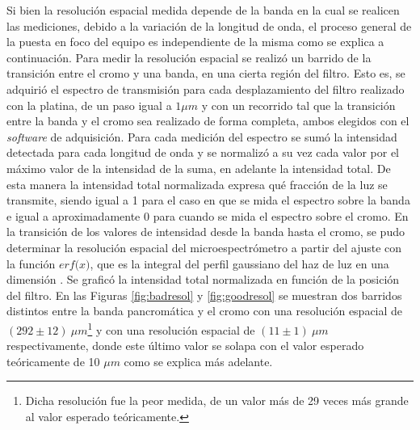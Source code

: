 Si bien la resolución espacial medida depende de la banda en la cual se realicen las mediciones, debido a la variación de la longitud de onda, el proceso general de la puesta en foco del equipo es independiente de la misma como se explica a continuación. Para medir la resolución espacial se realizó un barrido de la transición entre el cromo y una banda, en una cierta región del filtro. Esto es, se adquirió el espectro de transmisión para cada desplazamiento del filtro realizado con la platina, de un paso igual a $1\mu m$ y con un recorrido tal que la transición entre la banda y el cromo sea realizado de forma completa, ambos elegidos con el \textit{software} de adquisición. Para cada medición del espectro se sumó la intensidad detectada para cada longitud de onda y se normalizó a su vez cada valor por el máximo valor de la intensidad de la suma, en adelante la intensidad total. De esta manera la intensidad total normalizada expresa qué fracción de la luz se transmite, siendo igual a 1 para el caso en que se mida el espectro sobre la banda e igual a aproximadamente 0 para cuando se mida el espectro sobre el cromo. En la transición de los valores de intensidad desde la banda hasta el cromo, se pudo determinar la resolución espacial del microespectrómetro a partir del ajuste con la función $\textit{erf(x)}$, que es la integral del perfil gaussiano del haz de luz en una dimensión \cite{LASCH}. Se graficó la intensidad total normalizada en función de la posición del filtro. En las Figuras \ref{fig:badresol} y \ref{fig:goodresol} se muestran dos barridos distintos entre la banda pancromática y el cromo con una resolución espacial de $(292 \pm 12)~ \mu m$\footnote{Dicha resolución fue la peor medida, de un valor más de 29 veces más grande al valor esperado teóricamente.} y con una resolución espacial de $(11 \pm 1)~ \mu m$ respectivamente, donde este último valor se solapa con el valor esperado teóricamente de 10 $\mu m$ como se explica más adelante.

